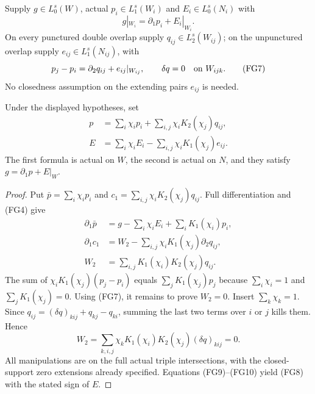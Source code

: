 Supply $g\in L_0^s(W)$, actual $p_i\in L_1^s(W_i)$ and
$E_i\in L_0^s(N_i)$ with
\[
                         g|_{W_i}=\partial_1p_i+E_i|_{W_i}.
                                                                  \tag{FG6}
\]
On every punctured double overlap supply $q_{ij}\in L_2^s(W_{ij})$;
on the unpunctured overlap supply $e_{ij}\in L_1^s(N_{ij})$, with
\[
 p_j-p_i=\partial_2q_{ij}+e_{ij}|_{W_{ij}},\qquad
                         \delta q=0\quad\hbox{on }W_{ijk}.
                                                                  \tag{FG7}
\]
No closedness assumption on the extending pairs $e_{ij}$ is needed.

\begin{theorem}
Under the displayed hypotheses, set
\[
\begin{split}
 p&=\sum_i\chi_i p_i+
                   \sum_{i,j}\chi_i K_2(\chi_j)q_{ij},\\
 E&=\sum_i\chi_i E_i-
                   \sum_{i,j}\chi_i K_1(\chi_j)e_{ij}.
\end{split}                                                       \tag{FG8}
\]
The first formula is actual on $W$, the second is actual on $N$,
and they satisfy $g=\partial_1p+E|_W$.
\end{theorem}

\begin{proof}
Put $\bar p=\sum_i\chi_i p_i$ and
$c_1=\sum_{i,j}\chi_i K_2(\chi_j)q_{ij}$.  Full differentiation
and (FG4) give
\[
\begin{split}
 \partial_1\bar p
       &=g-\sum_i\chi_iE_i+\sum_iK_1(\chi_i)p_i,\\
 \partial_1c_1
       &=W_2-\sum_{i,j}\chi_iK_1(\chi_j)\partial_2q_{ij},\\
 W_2&=\sum_{i,j}K_1(\chi_i)K_2(\chi_j)q_{ij}.
\end{split}                                                       \tag{FG9}
\]
The sum of $\chi_iK_1(\chi_j)(p_j-p_i)$ equals
$\sum_jK_1(\chi_j)p_j$ because $\sum_i\chi_i=1$ and
$\sum_jK_1(\chi_j)=0$.  Using (FG7), it remains to prove $W_2=0$.
Insert $\sum_k\chi_k=1$.  Since
$q_{ij}=(\delta q)_{kij}+q_{kj}-q_{ki}$, summing the last two
terms over $i$ or $j$ kills them.  Hence
\[
       W_2=\sum_{k,i,j}\chi_kK_1(\chi_i)K_2(\chi_j)
                                                    (\delta q)_{kij}=0.
                                                                  \tag{FG10}
\]
All manipulations are on the full actual triple intersections,
with the closed-support zero extensions already specified.
Equations (FG9)--(FG10) yield (FG8) with the stated sign of $E$.
\end{proof}

